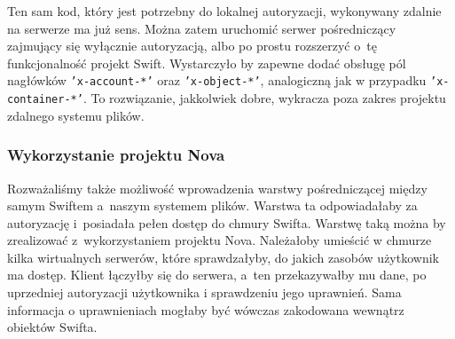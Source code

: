 	Ten sam kod, który jest potrzebny do lokalnej autoryzacji, wykonywany zdalnie na serwerze ma już sens. Można zatem uruchomić serwer pośredniczący zajmujący się wyłącznie autoryzacją, albo po prostu rozszerzyć o~tę funkcjonalność projekt Swift. Wystarczyło by zapewne dodać obsługę pól nagłówków \texttt{'x-account-*'} oraz \texttt{'x-object-*'}, analogiczną jak w przypadku \texttt{'x-container-*'}. To rozwiązanie, jakkolwiek dobre, wykracza poza zakres projektu zdalnego systemu plików.
	
	\subsubsection{Wykorzystanie projektu Nova}\label{sub:wykorzystanie projektu nova}

    Rozważaliśmy także możliwość wprowadzenia warstwy pośredniczącej między samym Swiftem a~naszym systemem plików. Warstwa ta odpowiadałaby za autoryzację i~posiadała pełen dostęp do chmury Swifta. Warstwę taką można by zrealizować z~wykorzystaniem projektu Nova. Należałoby umieścić w chmurze kilka wirtualnych serwerów, które sprawdzałyby, do jakich zasobów użytkownik ma dostęp. Klient łączyłby się do serwera, a~ten przekazywałby mu dane, po uprzedniej autoryzacji użytkownika i sprawdzeniu jego uprawnień. Sama informacja o uprawnieniach mogłaby być wówczas zakodowana wewnątrz obiektów Swifta.
